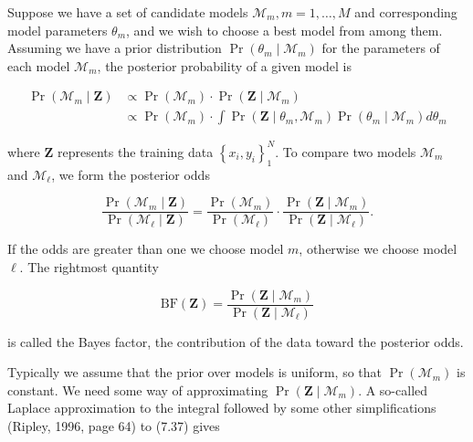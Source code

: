 \documentclass[10pt]{article}
\begin{document}
Suppose we have a set of candidate models $\mathcal{M}_{m}, m=1, \ldots, M$ and corresponding model parameters $\theta_{m}$, and we wish to choose a best model from among them. Assuming we have a prior distribution $\operatorname{Pr}\left(\theta_{m} \mid \mathcal{M}_{m}\right)$ for the parameters of each model $\mathcal{M}_{m}$, the posterior probability of a given model is


\begin{align*}
\operatorname{Pr}\left(\mathcal{M}_{m} \mid \mathbf{Z}\right) & \propto \operatorname{Pr}\left(\mathcal{M}_{m}\right) \cdot \operatorname{Pr}\left(\mathbf{Z} \mid \mathcal{M}_{m}\right)  \tag{7.37}\\
& \propto \operatorname{Pr}\left(\mathcal{M}_{m}\right) \cdot \int \operatorname{Pr}\left(\mathbf{Z} \mid \theta_{m}, \mathcal{M}_{m}\right) \operatorname{Pr}\left(\theta_{m} \mid \mathcal{M}_{m}\right) d \theta_{m}
\end{align*}


where $\mathbf{Z}$ represents the training data $\left\{x_{i}, y_{i}\right\}_{1}^{N}$. To compare two models $\mathcal{M}_{m}$ and $\mathcal{M}_{\ell}$, we form the posterior odds


\begin{equation*}
\frac{\operatorname{Pr}\left(\mathcal{M}_{m} \mid \mathbf{Z}\right)}{\operatorname{Pr}\left(\mathcal{M}_{\ell} \mid \mathbf{Z}\right)}=\frac{\operatorname{Pr}\left(\mathcal{M}_{m}\right)}{\operatorname{Pr}\left(\mathcal{M}_{\ell}\right)} \cdot \frac{\operatorname{Pr}\left(\mathbf{Z} \mid \mathcal{M}_{m}\right)}{\operatorname{Pr}\left(\mathbf{Z} \mid \mathcal{M}_{\ell}\right)} . \tag{7.38}
\end{equation*}


If the odds are greater than one we choose model $m$, otherwise we choose model $\ell$. The rightmost quantity


\begin{equation*}
\mathrm{BF}(\mathbf{Z})=\frac{\operatorname{Pr}\left(\mathbf{Z} \mid \mathcal{M}_{m}\right)}{\operatorname{Pr}\left(\mathbf{Z} \mid \mathcal{M}_{\ell}\right)} \tag{7.39}
\end{equation*}


is called the Bayes factor, the contribution of the data toward the posterior odds.

Typically we assume that the prior over models is uniform, so that $\operatorname{Pr}\left(\mathcal{M}_{m}\right)$ is constant. We need some way of approximating $\operatorname{Pr}\left(\mathbf{Z} \mid \mathcal{M}_{m}\right)$. A so-called Laplace approximation to the integral followed by some other simplifications (Ripley, 1996, page 64) to (7.37) gives
\end{document}
